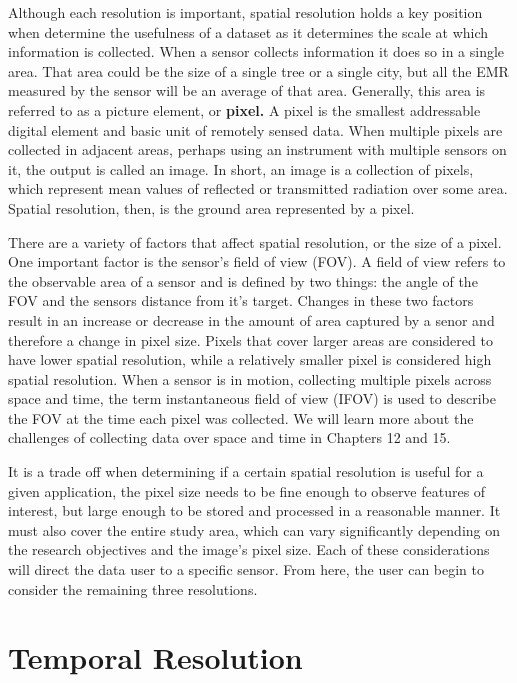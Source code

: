 \documentclass[
]{book}
\begin{document}
Although each resolution is important, spatial resolution holds a key
position when determine the usefulness of a dataset as it determines the
scale at which information is collected. When a sensor collects
information it does so in a single area. That area could be the size of
a single tree or a single city, but all the EMR measured by the sensor
will be an average of that area. Generally, this area is referred to as
a picture element, or \textbf{pixel.} A pixel is the smallest addressable
digital element and basic unit of remotely sensed data. When multiple
pixels are collected in adjacent areas, perhaps using an instrument with
multiple sensors on it, the output is called an image. In short, an
image is a collection of pixels, which represent mean values of
reflected or transmitted radiation over some area. Spatial
resolution, then, is the ground area represented by a pixel.

There are a variety of factors that affect spatial resolution, or the
size of a pixel. One important factor is the sensor's field of view
(FOV). A field of view refers to the observable area of a sensor and is
defined by two things: the angle of the FOV and the sensors distance
from it's target. Changes in these two factors result in an increase or
decrease in the amount of area captured by a senor and therefore a
change in pixel size. Pixels that cover larger areas are considered to
have lower spatial resolution, while a relatively smaller pixel is
considered high spatial resolution. When a sensor is in motion,
collecting multiple pixels across space and time, the term instantaneous
field of view (IFOV) is used to describe the FOV at the time each pixel
was collected. We will learn more about the challenges of collecting
data over space and time in Chapters 12 and 15.

It is a trade off when determining if a certain spatial resolution is
useful for a given application, the pixel size needs to be fine enough
to observe features of interest, but large enough to be stored and
processed in a reasonable manner. It must also cover the entire study
area, which can vary significantly depending on the research objectives
and the image's pixel size. Each of these considerations will direct the
data user to a specific sensor. From here, the user can begin to
consider the remaining three resolutions.

\hypertarget{temporal-resolution}{%
\section{Temporal Resolution}\label{temporal-resolution}}
\end{document}
